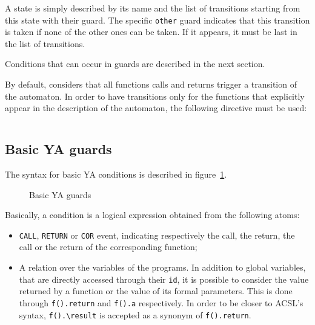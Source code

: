 \documentclass{report}
\begin{document}
A state is simply described by its name and the list of transitions
starting from this state with their guard. The specific \lstinline|other|
guard indicates that this transition is taken if none of the other ones
can be taken. If it appears, it must be last in the list of transitions.

Conditions that can occur in guards are described in the next section.

\begin{new}
By default, \aorai considers that all functions calls and returns trigger
a transition of the automaton. In order to have transitions only for the 
functions that explicitly appear in the description of the automaton, the
following directive must be used:
\begin{lstlisting}[language=ya]
%explicit transitions;
\end{lstlisting}
\end{new}

\subsection{Basic YA guards}\label{sec:basic-ya-guards}
The syntax for basic YA conditions is described in
figure~\ref{fig:basic_ya}.
\lstset{language=ya}
\begin{figure}

\caption{Basic YA guards}\label{fig:basic_ya}
\end{figure}

Basically, a condition is a logical expression obtained from the following
atoms:
\begin{itemize}
\item \lstinline|CALL|, \lstinline|RETURN| or \lstinline|COR| event, indicating 
  respectively the call, the return, the call or the return
  of the corresponding function;
\item A relation over the variables of the programs. In addition to global
variables, that are directly accessed through their \lstinline|id|, 
it is possible to consider the value returned by a function or the value of
its formal parameters. This is done through 
\lstinline|f().return| and \lstinline|f().a| respectively.
In order to be closer to ACSL's syntax, 
\lstinline|f().\result| is accepted as a synonym 
of \lstinline|f().return|. 
\end{itemize}
\end{document}
